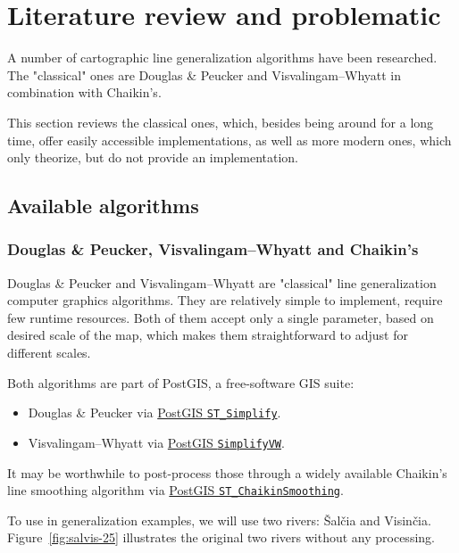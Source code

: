 \documentclass[a4paper]{article}
\newcommand{\DP}{Douglas \& Peucker}
\newcommand{\VW}{Visvalingam--Whyatt}
\begin{document}
\section{Literature review and problematic}
\label{sec:literature-review}

A number of cartographic line generalization algorithms have been researched.
The "classical" ones are {\DP}\cite{douglas1973algorithms} and
{\VW}\cite{visvalingam1993line} in combination with
Chaikin's\cite{chaikin1974algorithm}.

This section reviews the classical ones, which, besides being around for a long
time, offer easily accessible implementations, as well as more modern ones,
which only theorize, but do not provide an implementation.

\subsection{Available algorithms}

\subsubsection{{\DP}, {\VW} and Chaikin's}

{\DP}\cite{douglas1973algorithms} and {\VW}\cite{visvalingam1993line} are
"classical" line generalization computer graphics algorithms. They are
relatively simple to implement, require few runtime resources. Both of them
accept only a single parameter, based on desired scale of the map, which makes
them straightforward to adjust for different scales.

Both algorithms are part of PostGIS, a free-software GIS suite:
\begin{itemize}
    \item {\DP} via
        \href{https://postgis.net/docs/ST_Simplify.html}{PostGIS \texttt{ST\_Simplify}}.

    \item {\VW} via
        \href{https://postgis.net/docs/ST_SimplifyVW.html}{PostGIS \texttt{SimplifyVW}}.
\end{itemize}

It may be worthwhile to post-process those through a widely available Chaikin's
line smoothing algorithm\cite{chaikin1974algorithm} via
\href{https://postgis.net/docs/ST_ChaikinSmoothing.html}{PostGIS
\texttt{ST\_ChaikinSmoothing}}.

To use in generalization examples, we will use two rivers: Šalčia and Visinčia.
Figure~\ref{fig:salvis-25} illustrates the original two rivers without any
processing.
\end{document}
